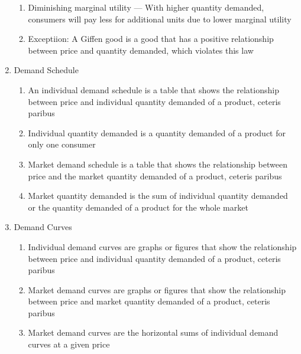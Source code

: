\documentclass[12pt]{article}
\begin{document}
\begin{enumerate}
\begin{enumerate}
          \item Diminishing marginal utility — With higher quantity demanded, consumers will pay less for additional units due to lower marginal utility
            
          \item Exceptiion: A Giffen good is a good that has a positive relationship between price and quantity demanded, which violates this law

        \end{enumerate}

      \item Demand Schedule

        \begin{enumerate}

          \item An individual demand schedule is a table that shows the relationship between price and individual quantity demanded of a product, ceteris paribus

          \item Individual quantity demanded is a quantity demanded of a product for only one consumer

          \item Market demand schedule is a table that shows the relationship between price and the market quantity demanded of a product, ceteris paribus

          \item Market quantity demanded is the sum of individual quantity demanded or the quantity demanded of a product for the whole market

        \end{enumerate}

      \item Demand Curves

        \begin{enumerate}

          \item Individual demand curves are graphs or figures that show the relationship between price and individual quantity demanded of a product, ceteris paribus

          \item Market demand curves are graphs or figures that show the relationship between price and market quantity demanded of a product, ceteris paribus

          \item Market demand curves are the horizontal sums of individual demand curves at a given price


\end{enumerate}
\end{enumerate}
\end{document}
